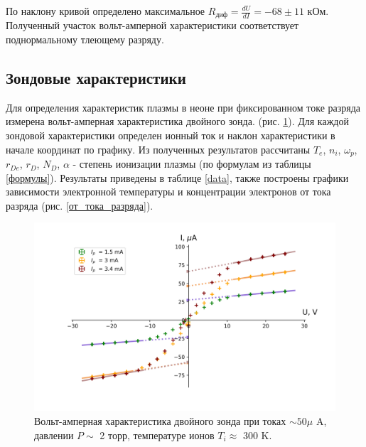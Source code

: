 \documentclass[a4paper,12pt]{article} %
\begin{document}
По наклону кривой определено максимальное $R_{диф}=\frac{dU}{dI} = -68 \pm 11$ кОм. Полученный участок вольт-амперной характеристики соответствует поднормальному тлеющему разряду.

\subsection{Зондовые характеристики} 
Для определения характеристик плазмы в неоне при фиксированном токе разряда измерена вольт-амперная характеристика двойного зонда. (рис. \ref{ВАХ_зонда}). Для каждой зондовой характеристики определен ионный ток и наклон характеристики в начале координат по графику. Из полученных результатов рассчитаны $T_e$, $n_i$, $\omega_p$, $r_{De}$, $r_D$, $N_D$, $\alpha$ - степень ионизации плазмы (по формулам из таблицы \ref{формулы}). Результаты приведены в таблице \ref{data}, также построены графики зависимости 
электронной температуры и концентрации электронов от тока разряда (рис. \ref{от_тока_разряда}).

\begin{figure}[h!]
\begin{center}
\includegraphics[width=\textwidth]{I(U)_probe}
\caption{Вольт-амперная характеристика двойного зонда при токах $\sim 50 \mu $ A, давлении $P \sim$ 2 торр, температуре ионов $T_i \approx $ 300 K.} \label{ВАХ_зонда}
\end{center}
\end{figure}
\end{document}
